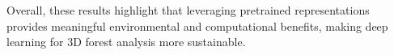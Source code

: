 \documentclass[review,authoryear]{elsarticle}
\begin{document}
Overall, these results highlight that leveraging pretrained representations provides meaningful environmental and computational benefits, making deep learning for 3D forest analysis more sustainable. 

\end{document}
